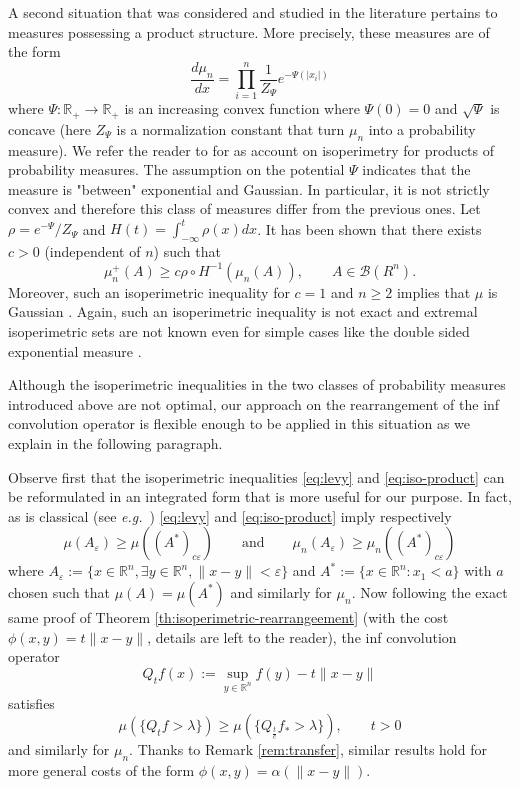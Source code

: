 \documentclass[11pt]{article}
\newcommand{\1}{[1]}
\begin{document}
A second situation that was considered and studied in the literature pertains to measures possessing a product structure. More precisely, these measures are of the form 
$$
\frac{d\mu_{n}}{dx}
=
\prod_{i= 1}^{n}\frac{1}{Z_{\Psi}}e^{-\Psi(|x_{i}|)}%
$$
where $\Psi:\mathbb{R}_{+}\rightarrow\mathbb{R}_+$ is an increasing convex function where $\Psi(0)=0$ and $\sqrt{\Psi}$ is concave (here $Z_\Psi$ is a normalization constant that turn $\mu_n$ into a probability measure). We refer the reader to \cite{roberto} for as account on isoperimetry for products of probability measures. The assumption on the potential $\Psi$ indicates that the measure is "between" exponential and Gaussian. In particular, it is not strictly convex and therefore this class of measures differ from the previous ones. 
Let $\rho=e^{-\Psi}/Z_\Psi$ and $H(t)=\int_{-\infty}^t \rho(x)dx$.
It has been shown \cite{bobkov-houdre97,BCR06,BCR07}
that there exists $c>0$ (independent of $n$) such that 
\begin{equation} \label{eq:iso-product}
\mu_{n}^+(A)\geq c \rho \circ H^{-1}(\mu_{n}(A)), \qquad  A\in\mathcal{B}(R^{n}) .
\end{equation}
Moreover, such an isoperimetric inequality for $c=1$ and $n \geq 2$ implies that $\mu$ is Gaussian \cite{bobkov-houdre}. Again, such an isoperimetric inequality is not exact and extremal isoperimetric sets are not known even for simple cases like the double sided exponential measure \cite{bobkov-houdre97,BCR06}.

Although the isoperimetric inequalities in the two classes of probability measures introduced above are not optimal, our approach on the rearrangement of the inf convolution operator is flexible enough to be applied in this situation as we explain in the following paragraph.

Observe first that the isoperimetric inequalities  
\eqref{eq:levy} and \eqref{eq:iso-product} can be reformulated in an integrated form that is more useful for our purpose. In fact, as is classical (see \textit{e.g.}\ \cite{ledoux}) \eqref{eq:levy} and \eqref{eq:iso-product} imply respectively 
$$
\mu(A_{\varepsilon})\geq\mu((A^*)_{c\varepsilon}) 
\qquad 
\mbox{and}
\qquad 
\mu_n(A_{\varepsilon})\geq\mu_n((A^*)_{c\varepsilon})
$$
where $A_{\varepsilon}:=\{x\in\mathbb{R}^{n},\exists y\in\mathbb{R}^{n}, \|x-y\|<\varepsilon\}$ and 
$A^*:=\{x\in\mathbb{R}^{n}:x_1<a\}$ with $a$ chosen such that
$\mu(A)=\mu(A^*)$ and similarly for $\mu_n$.
Now following the exact same proof of Theorem \ref{th:isoperimetric-rearrangeement} (with the cost $\phi(x,y)=t\|x-y\|$, details are left to the reader), the inf convolution operator
$$
Q_{t}f(x):=\sup_{y\in\mathbb{R}^{n}}f(y)-t\|x-y\|
$$
satisfies
$$
\mu\left(\{Q_{t}f>\lambda\}\right)
\geq
\mu\left(\{Q_{\frac{t}{c}}f_*>\lambda\}\right), \qquad t >0 
$$
and similarly for $\mu_n$. Thanks to Remark \ref{rem:transfer}, similar results hold for more general costs of the form $\phi(x,y)=\alpha(\|x-y\|)$.
\end{document}
